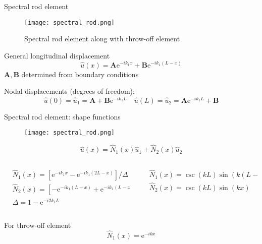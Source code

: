 \documentclass[10pt,aspectratio=169]{beamer} %
\newcommand{\matr}[1]{\boldsymbol{#1}}
\newcommand{\myexp}{\mathrm{e}}
\begin{document}
\note{
}
\begin{frame}[t]{Spectral rod element}
	\begin{figure}
		\texttt{[image: spectral\_rod.png]}
		\caption{Spectral rod element along with throw-off element}
	\end{figure}	
General longitudinal displacement
\begin{equation*}
	\hat{u}(x) = \matr{A} \myexp^{-i k_1 x} +\matr{B} \myexp^{-i k_1 (L-x)}
\end{equation*}
\( \matr{A}, \matr{B}\) determined from boundary conditions

Nodal displacements (degrees of freedom):
\begin{equation*}
\hat{u}(0) = \hat{u}_1 = \matr{A} + \matr{B} \myexp^{- i k_1 L} \quad  \hat{u}(L) = \hat{u}_2 = \matr{A} \myexp^{- i k_1 L} + \matr{B}
\end{equation*}
\end{frame}
\note{
}
\begin{frame}[t]{Spectral rod element: shape functions}
	\begin{figure}
	\texttt{[image: spectral\_rod.png]}
\end{figure}	
\begin{equation*}
\hat{u}(x) = \hat{N}_1(x) \hat{u}_1 + \hat{N}_2(x) \hat{u}_2
\end{equation*}
\begin{columns}[T]
	\begin{column}{0.5\textwidth}
		\begin{align*}
		&\hat{N}_1(x) = \left[ \myexp^{-i k _1 x} - \myexp^{-i k_1 (2L-x)}\right]/\Delta\\
		&\hat{N}_2(x) = \left[ -\myexp^{-i k _1(L+x) } + \myexp^{-i k_1 (L-x)}\right]/\Delta\\
		&\Delta = 1-\myexp^{-i 2 k_1 L}
		\end{align*}
	\end{column}
	\begin{column}{0.5\textwidth}
		\begin{align*}
	&\hat{N}_1(x) = \csc(k L) \sin\left(k (L-x)\right)\\
	&\hat{N}_2(x) = \csc(k L) \sin(k  x)
	\end{align*}	
	\end{column}
\end{columns}	
For throw-off element
\begin{equation*}
\hat{N}_1(x) = \myexp^{-i k x}
\end{equation*}	
\end{frame}
\end{document}
